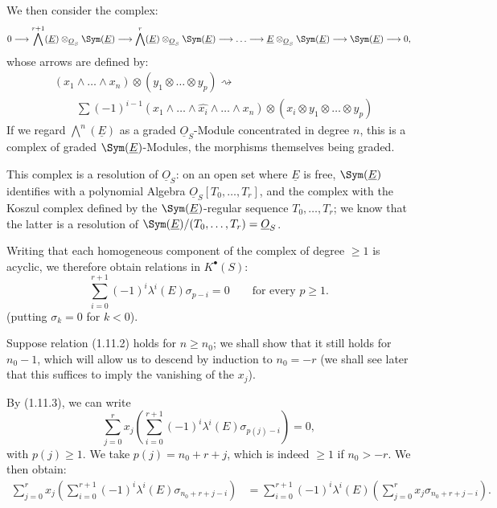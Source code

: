 We then consider the complex:
\[
  0\longrightarrow \bigwedge^{r+1}(\underline{E})\otimes_{\underline{O}_S}\Sym(\underline{E})
  \longrightarrow \bigwedge^r(\underline{E})\otimes_{\underline{O}_S}\Sym(\underline{E})
  \longrightarrow\ldots\longrightarrow
  \underline{E}\otimes_{\underline{O}_S}\Sym(\underline{E})
  \longrightarrow \Sym(\underline{E})\longrightarrow0,
\]
whose arrows are defined by:
\[
\begin{aligned}
&(x_1\wedge\ldots\wedge x_n)\otimes(y_1\otimes\ldots\otimes y_p)\rightsquigarrow{}\\
&\qquad \sum(-1)^{i-1}(x_1\wedge\ldots\wedge\widehat{x_i}\wedge\ldots\wedge x_n)
\otimes(x_i\otimes y_1\otimes\ldots\otimes y_p)
\end{aligned}
\]
If we regard \(\bigwedge^n(\underline{E})\) as a graded \(\underline{O}_S\)-Module concentrated in degree \(n\), this is a complex of graded \(\Sym(\underline{E})\)-Modules, the morphisms themselves being graded.

This complex is a resolution of \(\underline{O}_S\): on an open set where \(\underline{E}\) is free, \(\Sym(\underline{E})\) identifies with a polynomial Algebra \(\underline{O}_S[T_0,\ldots,T_r]\), and the complex with the Koszul complex defined by the \(\Sym(\underline{E})\)-regular sequence \(T_0,\ldots,T_r\); we know that the latter is a resolution of \(\Sym(\underline{E})/(T_0,\ldots,T_r)=\underline{O}_S\).

Writing that each homogeneous component of the complex of degree \(\geq1\) is acyclic, we therefore obtain relations in \(K^{\bullet}(S)\):
\begin{equation}\tag{1.11.3}
  \sum_{i=0}^{r+1}(-1)^i\lambda^i(E)\sigma_{p-i}=0
  \qquad\text{for every }p\geq1.
\end{equation}
(putting \(\sigma_k=0\) for \(k<0\)).

Suppose relation (1.11.2) holds for \(n\geq n_0\); we shall show that it still holds for \(n_0-1\), which will allow us to descend by induction to \(n_0=-r\) (we shall see later that this suffices to imply the vanishing of the \(x_j\)).

%
By (1.11.3), we can write
\begin{equation}\tag{1.11.4}
  \sum_{j=0}^r x_j\left(\sum_{i=0}^{r+1}(-1)^i\lambda^i(E)\sigma_{p(j)-i}\right)=0,
\end{equation}
with \(p(j)\geq1\). We take \(p(j)=n_0+r+j\), which is indeed \(\geq1\) if \(n_0>-r\). We then obtain:
\[
\begin{aligned}
\sum_{j=0}^r x_j\left(\sum_{i=0}^{r+1}(-1)^i\lambda^i(E)\sigma_{n_0+r+j-i}\right)
&=\sum_{i=0}^{r+1}(-1)^i\lambda^i(E)
   \left(\sum_{j=0}^r x_j\sigma_{n_0+r+j-i}\right).
\end{aligned}
\]

